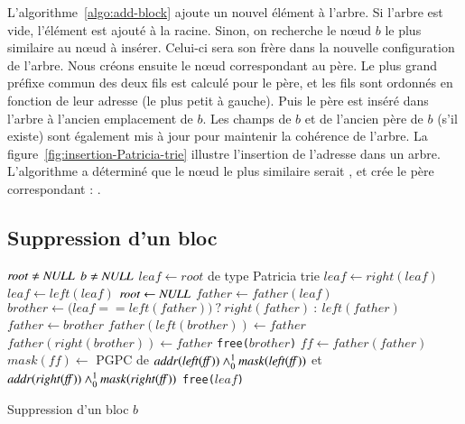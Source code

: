 


L'algorithme~\ref{algo:add-block} ajoute un nouvel élément à l'arbre.
Si l'arbre est vide, l'élément est ajouté à la racine.
Sinon, on recherche le n\oe{}ud $b$ le plus similaire au n\oe{}ud à insérer.
Celui-ci sera son frère dans la nouvelle configuration de l'arbre.
Nous créons ensuite le n\oe{}ud correspondant au père.
Le plus grand préfixe commun des deux fils est calculé pour le père, et les fils
sont ordonnés en fonction de leur adresse (le plus petit à gauche).
Puis le père est inséré dans l'arbre à l'ancien emplacement de $b$.
Les champs de $b$ et de l'ancien père de $b$ (s'il existe) sont également mis à
jour pour maintenir la cohérence de l'arbre.
La figure~\ref{fig:insertion-Patricia-trie} illustre l'insertion de l'adresse
 dans un arbre.
L'algorithme a déterminé que le n\oe{}ud le plus similaire serait
, et crée le père correspondant :
.


\subsection{Suppression d'un bloc}

\begin{algorithm}
\begin{algorithmic}
\Require $\mathit{root} \neq \mathit{NULL}$
\Require $b \neq \mathit{NULL}$
\State $\mathit{leaf} \gets \mathit{root}$ de type Patricia trie
    \State $\mathit{leaf} \gets \mathit{right(leaf)}$
  \Else
    \State $\mathit{leaf} \gets \mathit{left(leaf)}$
  \EndIf
\EndWhile
{}
  \State $\mathit{root} \gets \mathit{NULL}$
\Else
  \State $\mathit{father} \gets \mathit{father(leaf)}$
  \State $\mathit{brother} \gets (\mathit{leaf} == \mathit{left(father))} ~?~ \mathit{right(father)} ~:~ \mathit{left(father)}$
  \State $\mathit{father} \gets \mathit{brother}$
    \State $\mathit{father(left(brother))} \gets \mathit{father}$
    \State $\mathit{father(right(brother))} \gets \mathit{father}$
  \EndIf
  \State \lstinline'free('$\mathit{brother}$\lstinline')'
  \State $\mathit{ff} \gets \mathit{father(father)}$
    \State $\mathit{mask(ff)} \gets$ PGPC de $\mathit{addr(left(ff))} \land_0^1 \mathit{mask(left(ff))}$ et $\mathit{addr(right(ff))} \land_0^1 \mathit{mask(right(ff))}$
  \EndIf
\EndIf
\State \lstinline'free('$\mathit{leaf}$\lstinline')'
\end{algorithmic}
\caption{Suppression d'un bloc $b$
  \label{algo:rem-block}}
\end{algorithm}

